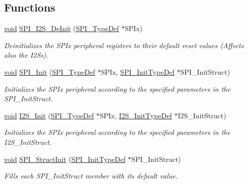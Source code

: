 \subsection*{Functions}
\begin{DoxyCompactItemize}
\item 
\hyperlink{usb__devapi_8h_afabf60e7f57651d6d595a02c75f07cd0}{void} \hyperlink{group___s_p_i___private___functions_gabe36880945fa56785283a9c0092124cc}{S\+P\+I\+\_\+\+I2\+S\+\_\+\+De\+Init} (\hyperlink{struct_s_p_i___type_def}{S\+P\+I\+\_\+\+Type\+Def} $\ast$S\+P\+Ix)
\begin{DoxyCompactList}\small\item\em Deinitializes the S\+P\+Ix peripheral registers to their default reset values (Affects also the I2\+Ss). \end{DoxyCompactList}\item 
\hyperlink{usb__devapi_8h_afabf60e7f57651d6d595a02c75f07cd0}{void} \hyperlink{group___s_p_i___private___functions_ga8dacc1dc48bf08c0f12da409f4889037}{S\+P\+I\+\_\+\+Init} (\hyperlink{struct_s_p_i___type_def}{S\+P\+I\+\_\+\+Type\+Def} $\ast$S\+P\+Ix, \hyperlink{struct_s_p_i___init_type_def}{S\+P\+I\+\_\+\+Init\+Type\+Def} $\ast$S\+P\+I\+\_\+\+Init\+Struct)
\begin{DoxyCompactList}\small\item\em Initializes the S\+P\+Ix peripheral according to the specified parameters in the S\+P\+I\+\_\+\+Init\+Struct. \end{DoxyCompactList}\item 
\hyperlink{usb__devapi_8h_afabf60e7f57651d6d595a02c75f07cd0}{void} \hyperlink{group___s_p_i___private___functions_ga53661884ae4a9640df7cbc59187782f7}{I2\+S\+\_\+\+Init} (\hyperlink{struct_s_p_i___type_def}{S\+P\+I\+\_\+\+Type\+Def} $\ast$S\+P\+Ix, \hyperlink{struct_i2_s___init_type_def}{I2\+S\+\_\+\+Init\+Type\+Def} $\ast$I2\+S\+\_\+\+Init\+Struct)
\begin{DoxyCompactList}\small\item\em Initializes the S\+P\+Ix peripheral according to the specified parameters in the I2\+S\+\_\+\+Init\+Struct. \end{DoxyCompactList}\item 
\hyperlink{usb__devapi_8h_afabf60e7f57651d6d595a02c75f07cd0}{void} \hyperlink{group___s_p_i___private___functions_ga9a0116f88cc2c4478c270f05608703f1}{S\+P\+I\+\_\+\+Struct\+Init} (\hyperlink{struct_s_p_i___init_type_def}{S\+P\+I\+\_\+\+Init\+Type\+Def} $\ast$S\+P\+I\+\_\+\+Init\+Struct)
\begin{DoxyCompactList}\small\item\em Fills each S\+P\+I\+\_\+\+Init\+Struct member with its default value. \end{DoxyCompactList}\item 

\end{DoxyCompactItemize}
